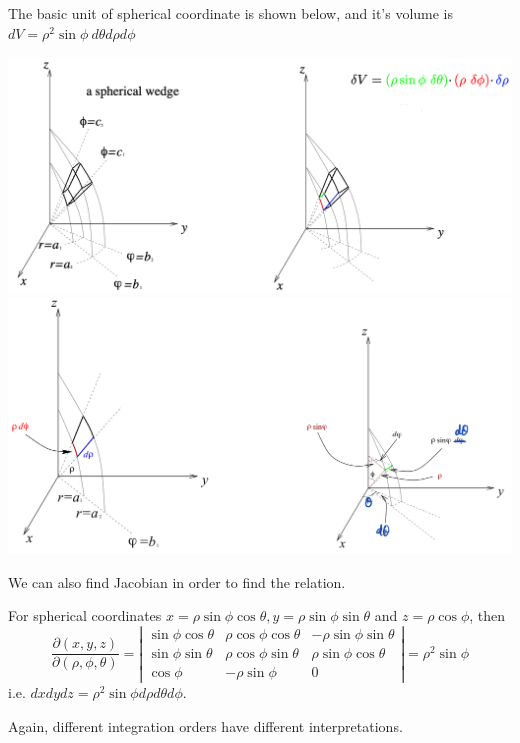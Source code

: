 \documentclass[11pt, a4paper]{MATH2023}
\begin{document}
\begin{spacing}{1.3}
    The basic unit of spherical coordinate is shown below, and it's volume is 
    $dV=\rho^2 \sin\phi \ d\theta d\rho d\phi$
    \begin{center}
        \includegraphics[scale=0.35]{images/Ch14-int-sphere-1.png}
        \includegraphics[scale=0.2]{images/Ch14-int-sphere-2.jpeg}
    \end{center}
    We can also find Jacobian in order to find the relation. 

    For spherical coordinates $x=\rho \sin \phi \cos \theta, y=\rho \sin \phi \sin \theta$ and $z=\rho \cos \phi$, then
    $$
    \frac{\partial(x, y, z)}{\partial(\rho, \phi, \theta)}=\left|\begin{array}{ccc}
    \sin \phi \cos \theta & \rho \cos \phi \cos \theta & -\rho \sin \phi \sin \theta \\
    \sin \phi \sin \theta & \rho \cos \phi \sin \theta & \rho \sin \phi \cos \theta \\
    \cos \phi & -\rho \sin \phi & 0
    \end{array}\right|=\rho^{2} \sin \phi
    $$
    i.e. $d x d y d z=\rho^{2} \sin \phi d \rho d \theta d \phi$.

    \vspace{0.5in}
    Again, different integration orders have different interpretations.


\end{spacing}
\end{document}
